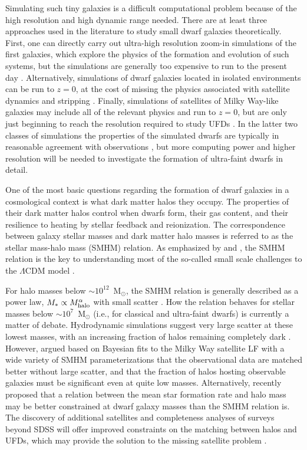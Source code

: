 \documentclass[a4paper]{ar-1col}
\newcommand{\msun}        {M$_{\odot}$}
\begin{document}
Simulating such tiny galaxies is a difficult computational problem
because of the high resolution and high dynamic range needed.  There
are at least three approaches used in the literature to study small
dwarf galaxies theoretically.  First, one can directly carry out
ultra-high resolution zoom-in simulations of the first galaxies, which
explore the physics of the formation and evolution of such systems,
but the simulations are generally too expensive to run to the present
day \citep[e.g.,][]{wise14,jeon15}.  Alternatively, simulations of
dwarf galaxies located in isolated environments can be run to $z=0$,
at the cost of missing the physics associated with satellite dynamics
and stripping \citep[e.g.,][]{simpson13,wheeler15}.  Finally,
simulations of satellites of Milky Way-like galaxies may include all
of the relevant physics and run to $z=0$, but are only just beginning
to reach the resolution required to study UFDs
\citep[e.g.,][]{wetzel16, gk18}.  In the latter two classes of
simulations the properties of the simulated dwarfs are typically in
reasonable agreement with observations
\citep[e.g.,][]{wetzel16,jeon17}, but more computing power and higher
resolution will be needed to investigate the formation of ultra-faint
dwarfs in detail.

One of the most basic questions regarding the formation of dwarf
galaxies in a cosmological context is what dark matter halos they
occupy.  The properties of their dark matter halos control when dwarfs
form, their gas content, and their resilience to heating by stellar
feedback and reionization.  The correspondence between galaxy stellar
masses and dark matter halo masses is referred to as the stellar
mass-halo mass (SMHM) relation.  As emphasized by \citet{bp17} and
\citet{kim18}, the SMHM relation is the key to understanding most of
the so-called small scale challenges to the $\Lambda$CDM model
\citep[e.g.,][]{bbk17}.

For halo masses below $\sim10^{12}$~\msun, the SMHM relation is
generally described as a power law, $M_{*} \propto M_{{\rm
    halo}}^{\alpha}$ with small scatter \citep{moster13,behroozi13}.
How the relation behaves for stellar masses below $\sim10^{7}$~\msun
(i.e., for classical and ultra-faint dwarfs) is currently a matter of
debate.  Hydrodynamic simulations suggest very large scatter at these
lowest masses, with an increasing fraction of halos remaining
completely dark \citep[e.g.,][]{shen14,sawala16b,munshi17}.  However,
\citet{jethwa18} argued based on Bayesian fits to the Milky Way
satellite LF with a wide variety of SMHM parameterizations that the
observational data are matched better without large scatter, and that
the fraction of halos hosting observable galaxies must be significant
even at quite low masses.  Alternatively, \citet{re18} recently
proposed that a relation between the mean star formation rate and halo
mass may be better constrained at dwarf galaxy masses than the SMHM
relation is.  The discovery of additional satellites and completeness
analyses of surveys beyond SDSS will offer improved constraints on the
matching between halos and UFDs, which may provide the solution to the
missing satellite problem \citep{kim18,re18}.
\end{document}
